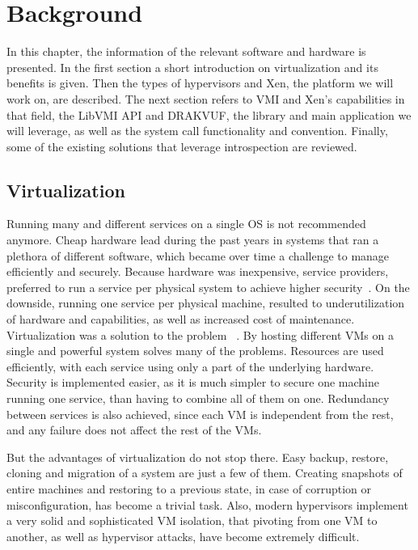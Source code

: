 
\chapter{Background}\label{ch:background}

In this chapter, the information of the relevant software and hardware is presented. In the first section a short introduction on virtualization and its benefits is given. Then the types of hypervisors and Xen, the platform we will work on, are described. The next section refers to \ac{VMI} and Xen's capabilities in that field, the LibVMI \ac{API} and DRAKVUF, the library and main application we will leverage, as well as the system call functionality and convention. Finally, some of the existing solutions that leverage introspection are reviewed.

\section{Virtualization}\label{sec:virtualization}
Running many and different services on a single \ac{OS} is not recommended anymore. Cheap hardware lead during the past years in systems that ran a plethora of different software, which became over time a challenge to manage efficiently and securely. Because hardware was inexpensive, service providers, preferred to run a service per physical system to achieve higher security~\cite{rosenblum2005virtual}. On the downside, running one service per physical machine, resulted to underutilization of hardware and capabilities, as well as increased cost of maintenance. Virtualization was a solution to the problem ~\cite{rosenblum2005virtual}. By hosting different \ac{VM}s on a single and powerful system solves many of the problems. Resources are used efficiently, with each service using only a part of the underlying hardware. Security is implemented easier, as it is much simpler to secure one machine running one service, than having to combine all of them on one. Redundancy between services is also achieved, since each \ac{VM} is independent from the rest, and any failure does not affect the rest of the \ac{VM}s.
\par But the advantages of virtualization do not stop there. Easy backup, restore, cloning and migration of a system are just a few of them. Creating snapshots of entire machines and restoring to a previous state, in case of corruption or misconfiguration, has become a trivial task. Also, modern hypervisors implement a very solid and sophisticated \ac{VM} isolation, that pivoting from one \ac{VM} to another, as well as hypervisor attacks, have become extremely difficult.

